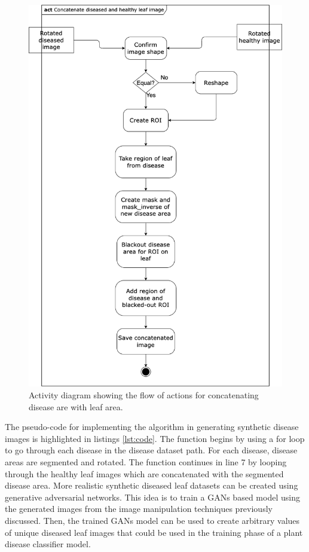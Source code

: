 \begin{figure}[!htb]
    \centering
    \includegraphics[scale=0.52, keepaspectratio]{Figures/act4.1.png}
    \caption{Activity diagram showing the flow of actions for concatenating disease are with leaf area.}
    \label{fig:my_act4}
\end{figure} 
The pseudo-code for implementing the algorithm in generating synthetic disease images is highlighted in listings \ref{lst:code}. 
The function begins by using a for loop to go through each disease in the disease dataset path. For each disease, disease areas are segmented and rotated. The function continues in line 7 by looping through the healthy leaf images which are concatenated with the segmented disease area.
More realistic synthetic diseased leaf datasets can be created using generative adversarial networks. This idea is to train a GANs based model using the generated images from the image manipulation techniques previously discussed. Then, the trained GANs model can be used to create arbitrary values of unique diseased leaf images that could be used in the training phase of a plant disease classifier model. 

